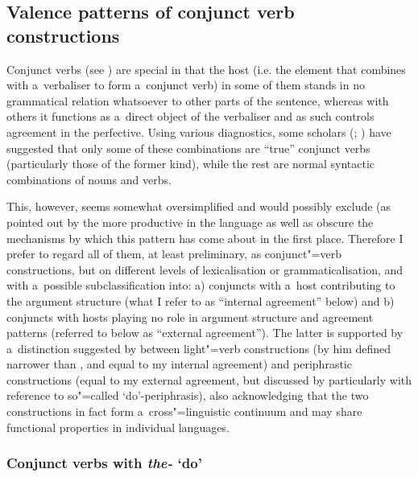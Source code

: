 \subsection{Valence patterns of conjunct verb constructions}
\label{subsec:12-2-8}

Conjunct verbs (see ) are special in that the host (i.e. the element that combines with a~verbaliser to form a~conjunct verb) in some of them stands in no grammatical relation whatsoever to other parts of the sentence, whereas with others it functions as a~direct object of the verbaliser and as such controls agreement in the perfective. Using various diagnostics, some scholars (\citealt[201]{verma1993}; \citealt[165]{mohanan1993}) have suggested that only some of these combinations are ``true'' conjunct verbs (particularly those of the former kind), while the rest are normal syntactic combinations of nouns and verbs. 



This, however, seems somewhat oversimplified and would possibly exclude (as pointed out by \citealt[160]{masica1993} the more productive in the language as well as obscure the mechanisms by which this pattern has come about in the first place. Therefore I prefer to regard all of them, at least preliminary, as conjunct"=verb constructions, but on different levels of lexicalisation or grammaticalisation, and with a~possible subclassification into: a) conjuncts with a~host contributing to the argument structure (what I refer to as ``internal agreement'' below) and b) conjuncts with hosts playing no role in argument structure and agreement patterns (referred to below as ``external agreement''). The latter is supported by a~distinction suggested by \citet[69--74]{jaeger2006} between light"=verb constructions (by him defined narrower than \citealt{butt2003}, and equal to my internal agreement) and periphrastic constructions (equal to my external agreement, but discussed by \citeauthor{jaeger2006} particularly with reference to so"=called `do'-periphrasis), also acknowledging that the two constructions in fact form a~cross"=linguistic continuum and may share functional properties in individual languages. 



\subsubsection*{Conjunct verbs with \textit{the-} `do'}

